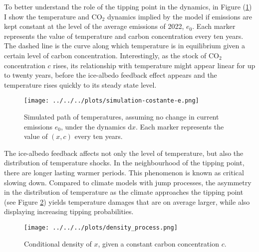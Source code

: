 \documentclass[../../main.tex]{subfiles}
\begin{document}
To better understand the role of the tipping point in the dynamics, in Figure (\ref{fig:x-sim}) I show the temperature and CO$_2$ dynamics implied by the model if emissions are kept constant at the level of the average emissions of 2022, $e_0$. Each marker represents the value of temperature and carbon concentration every ten years. The dashed line is the curve along which temperature is in equilibrium given a certain level of carbon concentration. Interestingly, as the stock of CO$_2$ concentration $c$ rises, its relationship with temperature might appear linear for up to twenty years, before the ice-albedo feedback effect appears and the temperature rises quickly to its steady state level.


\begin{figure}[H]
    \centering
    \texttt{[image: ../../../plots/simulation-costante-e.png]}
    \caption{Simulated path of temperatures, assuming no change in current emissions $e_0$, under the dynamics $\text{d}x$. Each marker represents the value of $(x, c)$ every ten years.}
    \label{fig:x-sim}
\end{figure}

The ice-albedo feedback affects not only the level of temperature, but also the distribution of temperature shocks. In the neighbourhood of the tipping point, there are longer lasting warmer periods. This phenomenon is known as critical slowing down. Compared to climate models with jump processes, the asymmetry in the distribution of temperature as the climate approaches the tipping point (see Figure \ref{fig:x-dens}) yields temperature damages that are on average larger, while also displaying increasing tipping probabilities.

\begin{figure}[H]
    \centering
    \texttt{[image: ../../../plots/density\_process.png]}
    \caption{Conditional density of $x$, given a constant carbon concentration $c$.}
    \label{fig:x-dens}
\end{figure}
\end{document}
